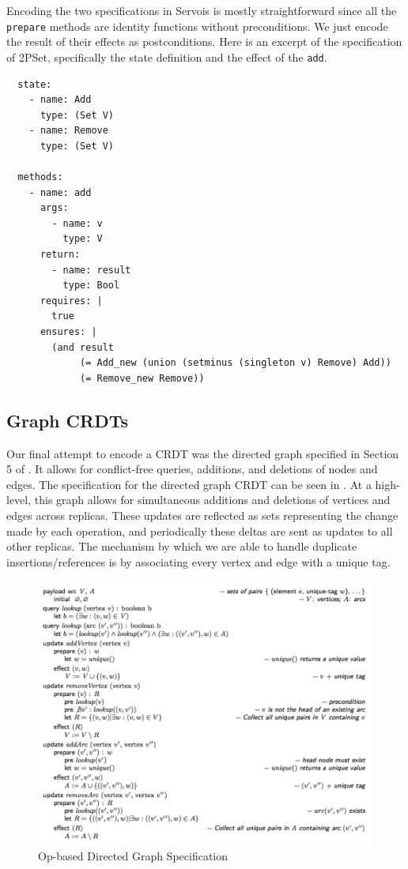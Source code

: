 \documentclass{article}
\begin{document}
Encoding the two specifications in Servois is mostly straightforward
since all the \texttt{prepare} methods are identity functions without
preconditions. We just encode the result of their effects as
postconditions. Here is an excerpt of the specification of 2PSet,
specifically the state definition and the effect of the \texttt{add}.

\begin{verbatim}
  state:
    - name: Add
      type: (Set V)
    - name: Remove
      type: (Set V)

  methods:
    - name: add
      args:
        - name: v
          type: V
      return:
        - name: result
          type: Bool
      requires: |
        true
      ensures: |
        (and result
             (= Add_new (union (setminus (singleton v) Remove) Add))
             (= Remove_new Remove))
\end{verbatim}

\subsection{Graph CRDTs}

Our final attempt to encode a CRDT was the directed graph specified in Section 5
of \cite{shapiro2011conflict}. It allows for conflict-free queries, additions,
and deletions of nodes and edges. The specification for the directed graph CRDT
can be seen in . At a high-level, this graph allows for
simultaneous additions and deletions of vertices and edges across replicas.
These updates are reflected as sets representing the change made by each
operation, and periodically these deltas are sent as updates to all other
replicas. The mechanism by which we are able to handle duplicate
insertions/references is by associating every vertex and edge with a unique tag.

\begin{figure}[h]
    \centering
    \includegraphics[width=1\textwidth]{directed-graph-def}
    \caption{Op-based Directed Graph Specification}
    \label{fig:graph-def}
\end{figure}
\end{document}
